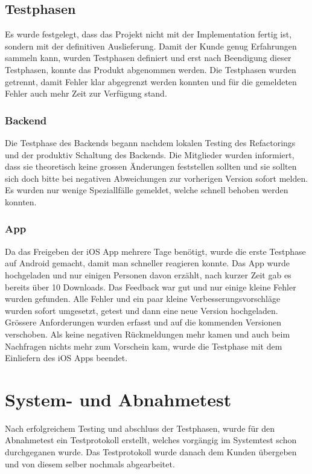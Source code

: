 \subsection{ Testphasen}
Es wurde festgelegt, dass das Projekt nicht mit der Implementation fertig ist, sondern mit der definitiven Auslieferung. Damit der Kunde genug Erfahrungen sammeln kann, wurden Testphasen definiert und erst nach Beendigung dieser Testphasen, konnte das Produkt abgenommen werden. Die Testphasen wurden getrennt, damit Fehler klar abgegrenzt werden konnten und für die gemeldeten Fehler auch mehr Zeit zur Verfügung stand.

\subsubsection{Backend}
Die Testphase des Backends begann nachdem lokalen Testing des Refactorings und der produktiv Schaltung des Backends. Die Mitglieder wurden informiert, dass sie theoretisch keine grossen Änderungen feststellen sollten und sie sollten sich doch bitte bei negativen Abweichungen zur vorherigen Version sofort melden. Es wurden nur wenige Speziallfälle gemeldet, welche schnell behoben werden konnten.

\subsubsection{App}
Da das Freigeben der iOS App mehrere Tage benötigt, wurde die erste Testphase auf Android gemacht, damit man schneller reagieren konnte. Das App wurde hochgeladen und nur einigen Personen davon erzählt, nach kurzer Zeit gab es bereits über 10 Downloads. Das Feedback war gut und nur einige kleine Fehler wurden gefunden. Alle Fehler und ein paar kleine Verbesserungsvorschläge wurden sofort umgesetzt, getest und dann eine neue Version hochgeladen. Grössere Anforderungen wurden erfasst und auf die kommenden Versionen verschoben. Als keine negativen Rückmeldungen mehr kamen und auch beim Nachfragen nichts mehr zum Vorschein kam, wurde die Testphase mit dem Einliefern des iOS Apps beendet.

\section{System- und Abnahmetest}
Nach erfolgreichem Testing und abschluss der Testphasen, wurde für den Abnahmetest ein Testprotokoll erstellt, welches vorgängig im Systemtest schon durchgeganen wurde. Das Testprotokoll wurde danach dem Kunden übergeben und von diesem selber nochmals abgearbeitet.

